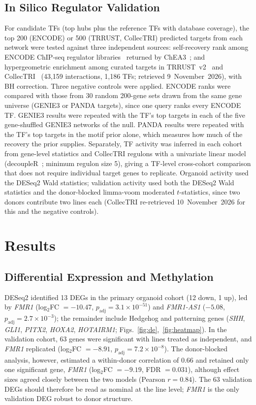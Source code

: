 \documentclass[journal]{IEEEtran}
\newcommand{\gene}[1]{\textit{#1}}
\begin{document}
\subsection{In Silico Regulator Validation}
For candidate TFs (top hubs plus the reference TFs with database coverage), the top 200 (ENCODE) or 500 (TRRUST, CollecTRI) predicted targets from each network were tested against three independent sources: self-recovery rank among ENCODE ChIP-seq regulator libraries~\cite{encode2012} returned by ChEA3~\cite{chea3}; and hypergeometric enrichment among curated targets in TRRUST~v2~\cite{trrust} and CollecTRI~\cite{collectri} (43,159 interactions, 1,186 TFs; retrieved 9~November~2026), with BH correction. Three negative controls were applied. ENCODE ranks were compared with those from 30 random 200-gene sets drawn from the same gene universe (GENIE3 or PANDA targets), since one query ranks every ENCODE TF. GENIE3 results were repeated with the TF's top targets in each of the five gene-shuffled GENIE3 networks of the null. PANDA results were repeated with the TF's top targets in the motif prior alone, which measures how much of the recovery the prior supplies. Separately, TF activity was inferred in each cohort from gene-level statistics and CollecTRI regulons with a univariate linear model (decoupleR~\cite{decoupler}; minimum regulon size 5), giving a TF-level cross-cohort comparison that does not require individual target genes to replicate. Organoid activity used the DESeq2 Wald statistics; validation activity used both the DESeq2 Wald statistics and the donor-blocked limma-voom moderated $t$-statistics, since two donors contribute two lines each (CollecTRI re-retrieved 10~November~2026 for this and the negative controls).

\section{Results}
\subsection{Differential Expression and Methylation}
DESeq2 identified 13 DEGs in the primary organoid cohort (12 down, 1 up), led by \gene{FMR1} (log$_2$FC $=-10.47$, $p_{\text{adj}}=3.1\times10^{-51}$) and \gene{FMR1-AS1} ($-5.08$, $p_{\text{adj}}=2.7\times10^{-3}$); the remainder include Hedgehog and patterning genes (\gene{SHH}, \gene{GLI1}, \gene{PITX2}, \gene{HOXA2}, \gene{HOTAIRM1}; Figs.~\ref{fig:de},~\ref{fig:heatmap}). In the validation cohort, 63 genes were significant with lines treated as independent, and \gene{FMR1} replicated (log$_2$FC $=-8.91$, $p_{\text{adj}}=7.2\times10^{-8}$). The donor-blocked analysis, however, estimated a within-donor correlation of 0.66 and retained only one significant gene, \gene{FMR1} (log$_2$FC $=-9.19$, FDR $=0.031$), although effect sizes agreed closely between the two models (Pearson $r=0.84$). The 63 validation DEGs should therefore be read as nominal at the line level; \gene{FMR1} is the only validation DEG robust to donor structure.
\end{document}
